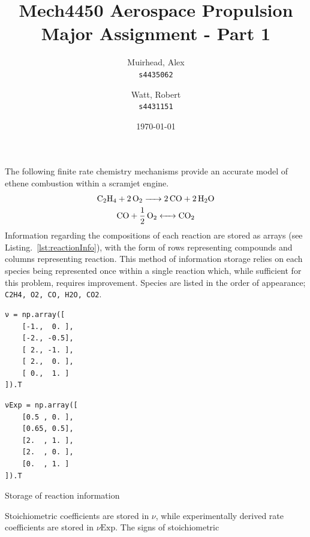 \documentclass[a4paper]{article}
\title{
	\Large {\sc Mech}4450 Aerospace Propulsion \\
	\Huge Major Assignment - Part 1
}
\author{
	Muirhead, Alex \\ \texttt{s4435062}
	\and
	Watt, Robert \\ \texttt{s4431151}
}
\date{\today}
\begin{document}
\maketitle


\vspace{10em}

\newpage
{}

The following finite rate chemistry mechanisms provide an accurate model of
ethene combustion within a scramjet engine.
\begin{gather}
	\label{eq: C2H4 combustion}
	\ce{C2H4 + 2O2 -> 2CO + 2H2O} \\
	\label{eq: CO2 formation}
	\ce{CO + \frac{1}{2} O2 <-> CO2}
\end{gather}
Information regarding the compositions of each reaction are stored as arrays
(see Listing.~\ref{lst:reactionInfo}), with the form of rows representing
compounds and columns representing reaction. This method of information storage
relies on each species being represented once within a single reaction which,
while sufficient for this problem, requires improvement. Species are listed in
the order of appearance; \verb|C2H4, O2, CO, H2O, CO2|.
\begin{listing}[H]
	\centering
	\begin{minipage}{0.3\linewidth}
		\begin{verbatim}
ν = np.array([
    [-1.,  0. ],
    [-2., -0.5],
    [ 2., -1. ],
    [ 2.,  0. ],
    [ 0.,  1. ]
]).T
		\end{verbatim}
	\end{minipage}%
	\hspace{3em}%
	\begin{minipage}{0.3\linewidth}
		\begin{verbatim}
νExp = np.array([
    [0.5 , 0. ],
    [0.65, 0.5],
    [2.  , 1. ],
    [2.  , 0. ],
    [0.  , 1. ]
]).T
		\end{verbatim}
	\end{minipage}
	\caption{Storage of reaction information}
	\label{lst:reactionInfo}
\end{listing}
Stoichiometric coefficients are stored in \(\nu\), while experimentally derived
rate coefficients are stored in \(\nu\text{Exp}\). The signs of stoichiometric
\end{document}
